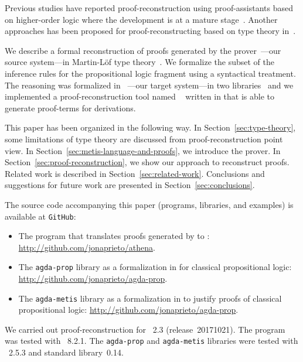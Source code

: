 \documentclass[../main.tex]{subfiles}
\begin{document}
Previous studies have reported proof-reconstruction using
proof-assistants based on higher-order logic where the development is
at a mature
stage~\cite{paulson2010three,hurlin07practical,kaliszyk2013}. Another
approaches has been proposed for proof-reconstructing based on type
theory in~\cite{Bezem2002,kanso2016light,Keller2013}.

We describe a formal reconstruction of proofs generated by the \Metis
prover~\cite{hurd2003first}---our source system---in Martin-Löf type
theory~\cite{Nordstrom-Petersson-Smith-1990}. We
formalize the subset of the \Metis inference rules for the
propositional logic fragment using a syntactical treatment.
The \Metis reasoning was formalized in
\Agda~\cite{agdateam}---our target system---in two
libraries~\cite{AgdaProp,AgdaMetis} and we implemented a
proof-reconstruction tool named \Athena~\cite{Athena} written in
\Haskell that is able to generate \Agda proof-terms for \Metis
derivations.

This paper has been organized in the following way.  In
Section~\ref{sec:type-theory}, some limitations of type theory are
discussed from proof-reconstruction point view.  In
Section~\ref{sec:metis-language-and-proofs}, we introduce the \Metis
prover.  In Section~\ref{sec:proof-reconstruction}, we show our
approach to reconstruct \Metis proofs.  Related work is described in
Section~\ref{sec:related-work}.  Conclusions and suggestions for
future work are presented in Section~\ref{sec:conclusions}.


The source code accompanying this paper (programs, libraries, and
examples) is available at \verb!GitHub!:
\begin{itemize}
  \item The \Athena program that translates proofs generated by \Metis to \Agda:
  \url{http://github.com/jonaprieto/athena}.
  \item The \verb!agda-prop! library as a formalization in \Agda for
    classical propositional logic:
  \url{http://github.com/jonaprieto/agda-prop}.
\item The \verb!agda-metis! library as a formalization in \Agda to
  justify \Metis proofs of classical propositional logic:
  \url{http://github.com/jonaprieto/agda-prop}.
\end{itemize}

We carried out proof-reconstruction for \Metis~2.3
(release~20171021). The \Athena program was tested with ~8.2.1.
The \verb!agda-prop! and \verb!agda-metis! libraries were tested with
\Agda~2.5.3 and \Agda standard library~0.14.
\end{document}
